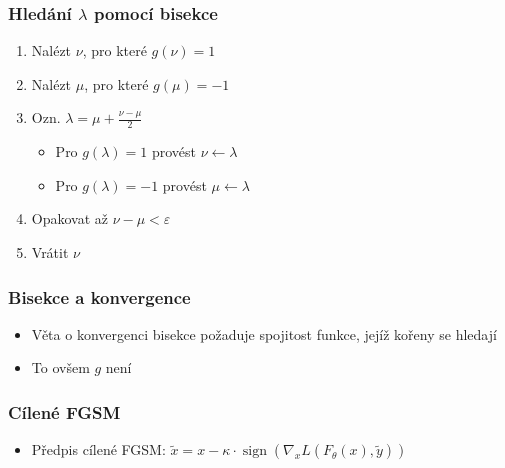 \documentclass[czech]{beamer}
\begin{document}
\begin{frame}
    \frametitle{Hledání $\lambda$ pomocí bisekce}
    \begin{enumerate}
        \item Nalézt $\nu$, pro které $g(\nu) = 1$
        \item Nalézt $\mu$, pro které $g(\mu) = -1$
        \item Ozn. $\lambda = \mu + \frac{\nu - \mu}{2}$
        \begin{itemize}
            \item Pro $g(\lambda) = 1$ provést $\nu \leftarrow \lambda$
            \item Pro $g(\lambda) = -1$ provést $\mu \leftarrow \lambda$
        \end{itemize}
        \item Opakovat až $\nu - \mu < \varepsilon$
        \item Vrátit $\nu$
    \end{enumerate}
\end{frame}

\begin{frame}
    \frametitle{Bisekce a konvergence}
    \begin{itemize}
        \item Věta o konvergenci bisekce požaduje spojitost funkce, jejíž kořeny se hledají
        \item To ovšem $g$ není
    \end{itemize}
\end{frame}

\begin{frame}
    \frametitle{Cílené FGSM}
    \begin{itemize}
        \item Předpis cílené FGSM: $\tilde{x} = x - \kappa \cdot \operatorname{sign} \left( \nabla_x L(F_\theta(x), \tilde{y}) \right)$
    \end{itemize}
\end{frame}
\end{document}
